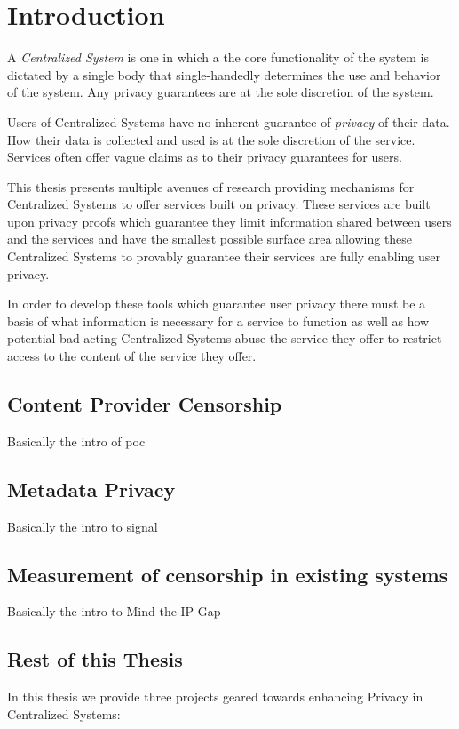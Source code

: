 \chapter{Introduction}

A \emph{Centralized System} is one in which a the core functionality of the
system is dictated by a single body that single-handedly determines the use and
behavior of the system. Any privacy guarantees are at the sole discretion of the
system.

Users of Centralized Systems have no inherent guarantee of \emph{privacy} of
their data. How their data is collected and used is at the sole discretion of
the service. Services often offer vague claims as to their privacy guarantees
for users.

This thesis presents multiple avenues of research providing mechanisms for
Centralized Systems to offer services built on privacy. These services are built
upon privacy proofs which guarantee they limit information shared between users
and the services and have the smallest possible surface area allowing these
Centralized Systems to provably guarantee their services are fully enabling user
privacy.

In order to develop these tools which guarantee user privacy there must be a
basis of what information is necessary for a service to function as well as how
potential bad acting Centralized Systems abuse the service they offer to
restrict access to the content of the service they offer.

\section{Content Provider Censorship}
Basically the intro of poc

\section{Metadata Privacy}
Basically the intro to signal

\section{Measurement of censorship in existing systems}
Basically the intro to Mind the IP Gap

\section{Rest of this Thesis}
In this thesis we provide three projects geared towards enhancing Privacy in
Centralized Systems:

